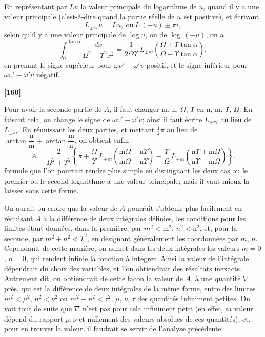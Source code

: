 \documentclass[11pt,a4paper]{article}
\begin{document}
En repr\'esentant par $Lu$ la valeur principale du logarithme de $u$, quand il y a
une valeur principale (c'est-\`a-dire quand la partie r\'eelle de $u$ est positive), et
\'ecrivant
\[L_{\pm\pi i} u = Lu,\ \text{ou}\ L\,(-u) \pm \pi i,\]
selon qu'il y a une valeur principale de $\log u$, ou de $\log\,(-u)$, on a
\begin{equation}
\int_0^{\tan\alpha} \frac{dx}{\Omega^2 - \Upsilon^2 x^2}
= \frac{1}{2\Omega\Upsilon}\, L_{\pm\pi i} \left(\frac{\Omega + \Upsilon\tan\alpha}{\Omega - \Upsilon\tan\alpha}\right), \tag{8}
\end{equation}
en prenant le signe sup\'erieur pour $\omega\upsilon' - \omega'\upsilon$ positif, et le signe inf\'erieur pour $\omega\upsilon' - \omega'\upsilon$
n\'egatif.


\textbf{[160]}

Pour avoir la seconde partie de $A$, il faut changer m, n, $\Omega$, $\Upsilon$ en n, m, $\Upsilon$, $\Omega$. En
faisant cela, on change le signe de $\omega\upsilon' - \omega'\upsilon$; ainsi il faut \'ecrire $L_{\mp\pi i}$ au lieu de $L_{\pm\pi i}$.
En r\'eunissant les deux parties, et mettant $\tfrac{1}{2}\pi$ au lieu de $\arctan\dfrac{\mathrm{n}}{\mathrm{m}} + \arctan\dfrac{\mathrm{m}}{\mathrm{n}}$, on
obtient enfin
\begin{equation}
A = \frac{2}{\Omega^2 + \Upsilon^2} \left\{\pi + \frac{\Omega}{\Upsilon}\, L_{\pm\pi i}\left(\frac{\mathrm{m}\Omega + \mathrm{n}\Upsilon}{\mathrm{m}\Omega - \mathrm{n}\Upsilon}\right)
- \frac{\Upsilon}{\Omega}\, L_{\pm\pi i}\left(\frac{\mathrm{n}\Upsilon + \mathrm{m}\Omega}{\mathrm{n}\Upsilon - \mathrm{m}\Omega}\right)\right\}. \tag{9}
\end{equation}
formule que l'on pourrait rendre plus simple en distinguant les deux cas ou le premier
ou le second logarithme a une valeur principale; mais il vaut mieux la laisser sous
 cette forme.

On aurait pu croire que la valeur de $A$ pourrait s'obtenir plus facilement en
r\'eduisant $A$ \`a la diff\'erence de deux int\'egrales d\'efinies, les conditions pour les limites
\'etant donn\'ees, dans la premi\`ere, par $m^2 < \mathrm{m}^2$, $n^2 < \mathrm{n}^2$, et, pour la seconde, par $m^2 + n^2 < T^2$,
en d\'esignant g\'en\'eralement les coordonn\'ees par $m$, $n$. Cependant, de cette mani\`ere, on
admet dans les deux int\'egrales les valeurs $m = 0$, $n = 0$, qui rendent infinie la fonction
\`a int\'egrer. Ainsi la valeur de l'int\'egrale d\'ependrait du choix des variables, et l'on
obtiendrait des r\'esultats inexacts. Autrement dit, on obtiendrait de cette facon la
valeur de $A$, \`a une quantit\'e $\nabla$ pr\`es, qui est la diff\'erence de deux int\'egrales de la
m\^eme forme, entre des limites $m^2 < \mu^2$, $n^2 < \nu^2$ ou $m^2 + n^2 < \tau^2$, $\mu$, $\nu$, $\tau$ des quantit\'es
infiniment petites. On voit tout de suite que $\nabla$ n'est pas pour cela infiniment petit
(en effet, sa valeur d\'epend du rapport $\mu : \nu$ et nullement des valeurs absolues de ces
quantit\'es), et, pour en trouver la valeur, il faudrait se servir de l'analyse pr\'ec\'edente.
\end{document}
